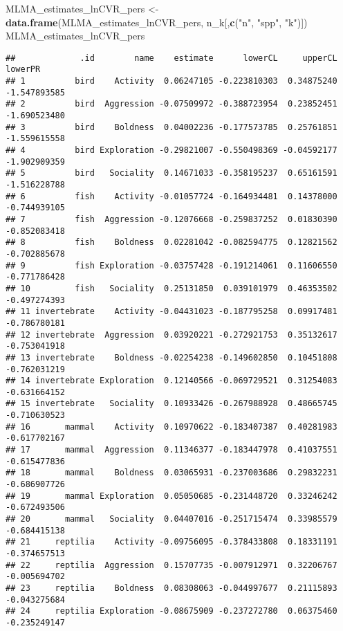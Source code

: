 \documentclass[]{article}
\newenvironment{Shaded}{\begin{snugshade}}{\end{snugshade}}
\newcommand{\KeywordTok}[1]{\textcolor[rgb]{0.13,0.29,0.53}{\textbf{#1}}}
\newcommand{\StringTok}[1]{\textcolor[rgb]{0.31,0.60,0.02}{#1}}
\newcommand{\NormalTok}[1]{#1}
\begin{document}
\begin{Shaded}
\begin{Highlighting}[]
\NormalTok{  MLMA_estimates_lnCVR_pers <-}\StringTok{ }\KeywordTok{data.frame}\NormalTok{(MLMA_estimates_lnCVR_pers, n_k[,}\KeywordTok{c}\NormalTok{(}\StringTok{"n"}\NormalTok{, }\StringTok{"spp"}\NormalTok{, }\StringTok{"k"}\NormalTok{)])}
\NormalTok{      MLMA_estimates_lnCVR_pers}
\end{Highlighting}
\end{Shaded}

\begin{verbatim}
##             .id        name    estimate      lowerCL     upperCL      lowerPR
## 1          bird    Activity  0.06247105 -0.223810303  0.34875240 -1.547893585
## 2          bird  Aggression -0.07509972 -0.388723954  0.23852451 -1.690523480
## 3          bird    Boldness  0.04002236 -0.177573785  0.25761851 -1.559615558
## 4          bird Exploration -0.29821007 -0.550498369 -0.04592177 -1.902909359
## 5          bird   Sociality  0.14671033 -0.358195237  0.65161591 -1.516228788
## 6          fish    Activity -0.01057724 -0.164934481  0.14378000 -0.744939105
## 7          fish  Aggression -0.12076668 -0.259837252  0.01830390 -0.852083418
## 8          fish    Boldness  0.02281042 -0.082594775  0.12821562 -0.702885678
## 9          fish Exploration -0.03757428 -0.191214061  0.11606550 -0.771786428
## 10         fish   Sociality  0.25131850  0.039101979  0.46353502 -0.497274393
## 11 invertebrate    Activity -0.04431023 -0.187795258  0.09917481 -0.786780181
## 12 invertebrate  Aggression  0.03920221 -0.272921753  0.35132617 -0.753041918
## 13 invertebrate    Boldness -0.02254238 -0.149602850  0.10451808 -0.762031219
## 14 invertebrate Exploration  0.12140566 -0.069729521  0.31254083 -0.631664152
## 15 invertebrate   Sociality  0.10933426 -0.267988928  0.48665745 -0.710630523
## 16       mammal    Activity  0.10970622 -0.183407387  0.40281983 -0.617702167
## 17       mammal  Aggression  0.11346377 -0.183447978  0.41037551 -0.615477836
## 18       mammal    Boldness  0.03065931 -0.237003686  0.29832231 -0.686907726
## 19       mammal Exploration  0.05050685 -0.231448720  0.33246242 -0.672493506
## 20       mammal   Sociality  0.04407016 -0.251715474  0.33985579 -0.684415138
## 21     reptilia    Activity -0.09756095 -0.378433808  0.18331191 -0.374657513
## 22     reptilia  Aggression  0.15707735 -0.007912971  0.32206767 -0.005694702
## 23     reptilia    Boldness  0.08308063 -0.044997677  0.21115893 -0.043275684
## 24     reptilia Exploration -0.08675909 -0.237272780  0.06375460 -0.235249147

\end{verbatim}
\end{document}
